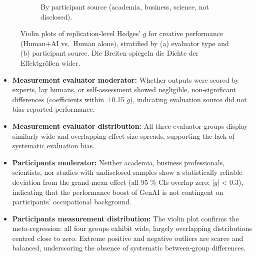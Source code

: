 \documentclass[manuscript, screen, review, acmsmall, anonymous]{acmart}
\begin{document}
\begin{figure}[H]
\begin{subfigure}[t]{0.49\linewidth}
    \caption{By participant source (academia, business, science, not disclosed).}
    \label{fig:performance_raw_violin_participants}
  \end{subfigure}
  \caption{Violin plots of replication-level Hedges’ $g$ for creative performance (Human+AI vs.\ Human alone), stratified by (a) evaluator type and (b) participant source. Die Breiten spiegeln die Dichte der Effektgrößen wider.}
  \label{fig:performance_raw_violins_eval_part}
\end{figure}
\begin{itemize}
  \item \textbf{Measurement evaluator moderator:} Whether outputs were scored by experts, lay humans, or self‑assessment showed negligible, non‑significant differences (coefficients within ±0.15 $g$), indicating evaluation source did not bias reported performance.
  \item \textbf{Measurement evaluator distribution:} All three evaluator groups display similarly wide and overlapping effect‑size spreads, supporting the lack of systematic evaluation bias.
  \item \textbf{Participants moderator:} Neither academia, business professionals, scientists, nor studies with undisclosed samples show a statistically reliable deviation from the grand‑mean effect (all 95 \% CIs overlap zero; |$g$| < 0.3), indicating that the performance boost of GenAI is not contingent on participants’ occupational background.
  \item \textbf{Participants measurement distribution:} The violin plot confirms the meta‑regression: all four groups exhibit wide, largely overlapping distributions centred close to zero. Extreme positive and negative outliers are scarce and balanced, underscoring the absence of systematic between‑group differences.
\end{itemize}
\end{document}
